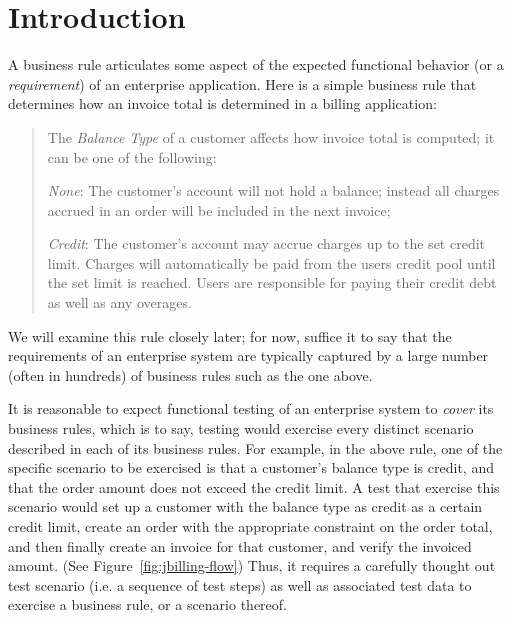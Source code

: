 \section{Introduction}

A business rule articulates some aspect of the expected functional behavior (or a \textit{requirement})
of an enterprise application. Here is a simple business rule that determines how an invoice total is 
determined in a billing application:

\begin{quote}
	The \textit{Balance Type} of a customer affects how invoice total is computed; it can be 
	one of the following:

	\textit{None}: The customer's account will not hold a balance; instead all charges accrued 
	in an order will be included in the next invoice;
	
	\textit{Credit}: The customer's account may accrue charges up to the set credit limit. 
	Charges will automatically be paid from the users credit pool until the set limit is reached. 
	Users are responsible for paying their credit debt as well as any overages.
\end{quote}	

We will examine this rule closely later; for now, suffice it to say that the requirements 
of an enterprise system are typically captured by a large number (often in hundreds) of business rules
such as the one above.

It is reasonable to expect functional testing of an enterprise system to \textit{cover} its 
business rules, which is to say, testing would exercise every distinct scenario described in each of
its business rules.  For example, in the above rule, one of the specific scenario to be exercised is
that a customer's balance type is credit, and that the order amount does not exceed the credit limit.
A test that exercise this scenario would set up a customer with the balance type as credit as a certain
credit limit, create an order with the appropriate constraint on the order total, and then finally
create an invoice for that customer, and verify the invoiced amount.  (See Figure~\ref{fig:jbilling-flow}) Thus, it requires a carefully 
thought out test scenario (i.e. a sequence of test steps) as well as associated test data to exercise 
a business rule, or a scenario thereof.

